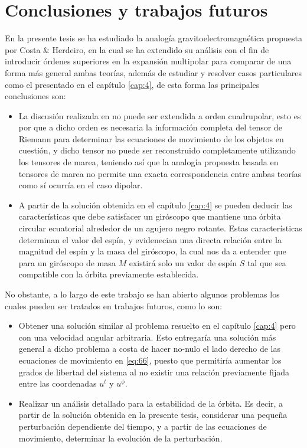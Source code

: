 \chapter{Conclusiones y trabajos futuros}

En la presente tesis se ha estudiado la analogía gravitoelectromagnética propuesta por Costa \& Herdeiro, en la cual se ha extendido su análisis con el fin de introducir órdenes superiores en la expansión multipolar para comparar de una forma más general ambas teorías, además de estudiar y resolver casos particulares como el presentado en el capítulo \ref{cap:4}, de esta forma las principales conclusiones son:
\begin{itemize}
\item La discusión realizada en \cite{Costa-Herdeiro} no puede ser extendida a orden cuadrupolar, esto es por que a dicho orden es necesaria la información completa del tensor de Riemann para determinar las ecuaciones de movimiento de los objetos en cuestión, y dicho tensor no puede ser reconstruido completamente utilizando los tensores de marea, teniendo así que la analogía propuesta basada en tensores de marea no permite una exacta correspondencia entre ambas teorías como sí ocurría en el caso dipolar.
\item A partir de la solución obtenida en el capítulo \ref{cap:4} se pueden deducir las características que debe satisfacer un giróscopo que mantiene una órbita circular ecuatorial alrededor de un agujero negro rotante. Estas características determinan el valor del espín, y evidenecian una directa relación entre la magnitud del espín y la masa del giróscopo, la cual nos da a entender que para un giróscopo de masa $M$ existirá solo un valor de espín $S$ tal que sea compatible con la órbita previamente establecida.
\end{itemize}

No obstante, a lo largo de este trabajo se han abierto algunos problemas los cuales pueden ser tratados en trabajos futuros, como lo son:
\begin{itemize}
\item Obtener una solución similar al problema resuelto en el capítulo \ref{cap:4} pero con una velocidad angular arbitraria. Esto entregaría una solución más general a dicho problema a costa de hacer no-nulo el lado derecho de las ecuaciones de movimiento en \eqref{eq:66}, puesto que permitiría aumentar los grados de libertad del sistema al no existir una relación previamente fijada entre las coordenadas $u^t$ y $u^{\phi}$.
\item Realizar un análisis detallado para la estabilidad de la órbita. Es decir, a partir de la solución obtenida en la presente tesis, considerar una pequeña perturbación dependiente del tiempo, y a partir de las ecuaciones de movimiento, determinar la evolución de la perturbación.
\end{itemize}